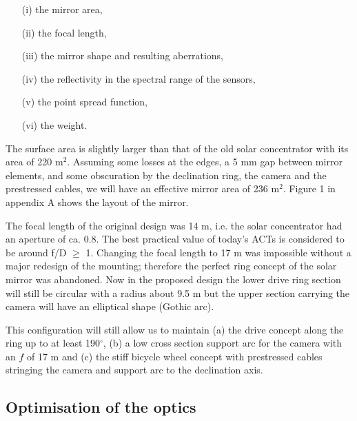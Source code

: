 \begin{itemize}
\item[(i)]  the mirror area,

\item[(ii)]  the focal length,

\item[(iii)]  the mirror shape and resulting aberrations,

\item[(iv)]  the reflectivity in the spectral range of the sensors,

\item[(v)]  the point spread function,

\item[(vi)]  the weight.
\end{itemize}

The surface area is slightly larger than that of the old solar concentrator
with its area of 220 m$^{2}$. Assuming some losses at the edges, a 5 mm gap
between mirror elements, and some obscuration by the declination ring, the
camera and the prestressed cables, we will have an effective mirror area of
236 m$^{2}$. Figure 1 in appendix A shows the layout of the mirror.

The focal length of the original design was 14 m, i.e. the solar
concentrator had
an aperture of ca. 0.8. The best practical value of today's ACTs is
considered to be around f/D $\geq$ 1. Changing the focal length to 17 m
was impossible without a major redesign of the mounting; therefore the
perfect ring concept of the solar mirror was abandoned. Now in the
proposed design the lower drive ring section will still be circular with a
radius about 9.5 m but the upper section carrying the camera will have an
elliptical shape (Gothic arc).

This configuration will still allow us to maintain (a) the drive concept
along the ring up to at least 190$^\circ$, (b) a low cross section support
arc for the camera with an $f$ of 17 m and (c) the stiff bicycle wheel
concept with prestressed cables stringing the camera and support arc to the
declination axis.

\subsection{Optimisation of the optics}


